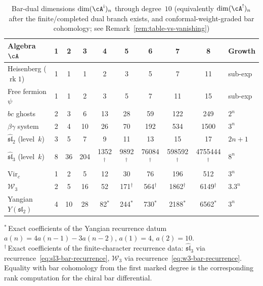 \begin{table}[ht]
\centering
\caption{Bar-dual dimensions $\dim(\cA^{\mathrm i})_n$ through degree~$10$
\textup{(}equivalently $\dim(\cA^!)_n$ after the finite/completed dual
branch exists, and conformal-weight-graded bar cohomology;
see Remark~\ref{rem:table-vs-vanishing})}
\label{tab:bar-dimensions}
\renewcommand{\arraystretch}{1.4}
{\scriptsize
\begin{tabular}{|l|c|c|c|c|c|c|c|c|l|}
\hline
\textbf{Algebra $\cA$}
 & \textbf{1} & \textbf{2} & \textbf{3}
 & \textbf{4} & \textbf{5} & \textbf{6}
 & \textbf{7} & \textbf{8}
 & \textbf{Growth} \\
\hline
Heisenberg ($\operatorname{rk}1$)
 & 1 & 1 & 1 & 2 & 3 & 5 & 7 & 11 & sub-exp \\
\hline
Free fermion $\psi$
 & 1 & 1 & 2 & 3 & 5 & 7 & 11 & 15 & sub-exp \\
\hline
$bc$ ghosts
 & 2 & 3 & 6 & 13 & 28 & 59 & 122 & 249 & $2^n$ \\
\hline
$\beta\gamma$ system
 & 2 & 4 & 10 & 26 & 70 & 192 & 534 & 1500 & $3^n$ \\
\hline
$\widehat{\mathfrak{sl}}_2$ (level~$k$)
 & 3 & 5 & 7 & 9 & 11 & 13 & 15 & 17 & $2n{+}1$ \\
\hline
$\widehat{\mathfrak{sl}}_3$ (level~$k$)
 & 8 & 36 & 204 & 1352$^\dagger$ & 9892$^\dagger$ & 76084$^\dagger$ & 598592$^\dagger$ & 4755444$^\dagger$ & $8^n$ \\
\hline
$\mathrm{Vir}_c$
 & 1 & 2 & 5 & 12 & 30 & 76 & 196 & 512 & $3^n$ \\
\hline
$\mathcal{W}_3$
 & 2 & 5 & 16 & 52 & 171$^\dagger$ & 564$^\dagger$ & 1862$^\dagger$ & 6149$^\dagger$ & $3.3^n$ \\
\hline
Yangian $Y(\mathfrak{sl}_2)$
 & 4 & 10 & 28 & 82$^*$ & 244$^*$ & 730$^*$ & 2188$^*$ & 6562$^*$ & $3^n$ \\
\hline
\end{tabular}
}

\medskip
\noindent
{\footnotesize $^*$\,Exact coefficients of the Yangian recurrence datum
$a(n)=4a(n{-}1)-3a(n{-}2)$, $a(1)=4$, $a(2)=10$.\\
$^\dagger$\,Exact coefficients of the finite-character recurrence data:
$\widehat{\mathfrak{sl}}_3$ via recurrence~\eqref{eq:sl3-bar-recurrence},
$\mathcal{W}_3$ via recurrence~\eqref{eq:w3-bar-recurrence}.
Equality with bar cohomology from the first marked degree is the
corresponding rank computation for the chiral bar differential.}
\end{table}

